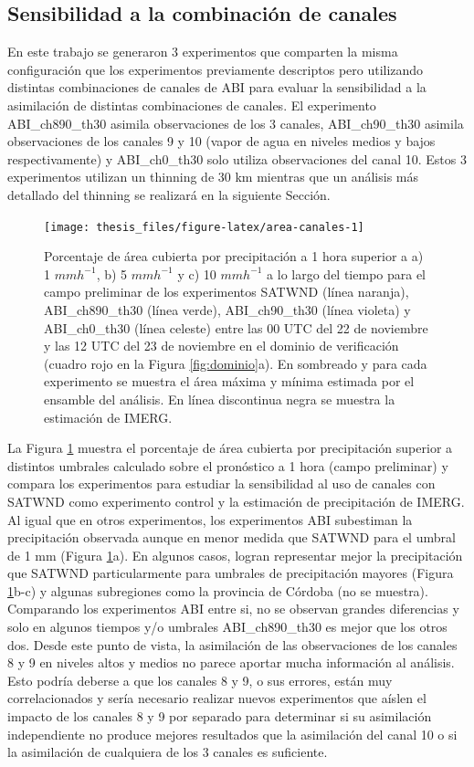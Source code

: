 \documentclass[12pt,oneside,a4paper]{reedthesis}
\begin{document}
\hypertarget{canales}{%
\subsection{Sensibilidad a la combinación de canales}\label{canales}}

En este trabajo se generaron 3 experimentos que comparten la misma configuración que los experimentos previamente descriptos pero utilizando distintas combinaciones de canales de ABI para evaluar la sensibilidad a la asimilación de distintas combinaciones de canales. El experimento ABI\_ch890\_th30 asimila observaciones de los 3 canales, ABI\_ch90\_th30 asimila observaciones de los canales 9 y 10 (vapor de agua en niveles medios y bajos respectivamente) y ABI\_ch0\_th30 solo utiliza observaciones del canal 10. Estos 3 experimentos utilizan un thinning de 30 km mientras que un análisis más detallado del thinning se realizará en la siguiente Sección.


\begin{figure}
\texttt{[image: thesis\_files/figure-latex/area-canales-1]} \caption{Porcentaje de área cubierta por precipitación a 1 hora superior a a) 1 \(mmh^{-1}\), b) 5 \(mmh^{-1}\) y c) 10 \(mmh^{-1}\) a lo largo del tiempo para el campo preliminar de los experimentos SATWND (línea naranja), ABI\_ch890\_th30 (línea verde), ABI\_ch90\_th30 (línea violeta) y ABI\_ch0\_th30 (línea celeste) entre las 00 UTC del 22 de noviembre y las 12 UTC del 23 de noviembre en el dominio de verificación (cuadro rojo en la Figura \ref{fig:dominio}a). En sombreado y para cada experimento se muestra el área máxima y mínima estimada por el ensamble del análisis. En línea discontinua negra se muestra la estimación de IMERG.}\label{fig:area-canales}
\end{figure}
La Figura \ref{fig:area-canales} muestra el porcentaje de área cubierta por precipitación superior a distintos umbrales calculado sobre el pronóstico a 1 hora (campo preliminar) y compara los experimentos para estudiar la sensibilidad al uso de canales con SATWND como experimento control y la estimación de precipitación de IMERG. Al igual que en otros experimentos, los experimentos ABI subestiman la precipitación observada aunque en menor medida que SATWND para el umbral de 1 mm (Figura \ref{fig:area-canales}a). En algunos casos, logran representar mejor la precipitación que SATWND particularmente para umbrales de precipitación mayores (Figura \ref{fig:area-canales}b-c) y algunas subregiones como la provincia de Córdoba (no se muestra). Comparando los experimentos ABI entre si, no se observan grandes diferencias y solo en algunos tiempos y/o umbrales ABI\_ch890\_th30 es mejor que los otros dos. Desde este punto de vista, la asimilación de las observaciones de los canales 8 y 9 en niveles altos y medios no parece aportar mucha información al análisis. Esto podría deberse a que los canales 8 y 9, o sus errores, están muy correlacionados y sería necesario realizar nuevos experimentos que aíslen el impacto de los canales 8 y 9 por separado para determinar si su asimilación independiente no produce mejores resultados que la asimilación del canal 10 o si la asimilación de cualquiera de los 3 canales es suficiente.
\end{document}

